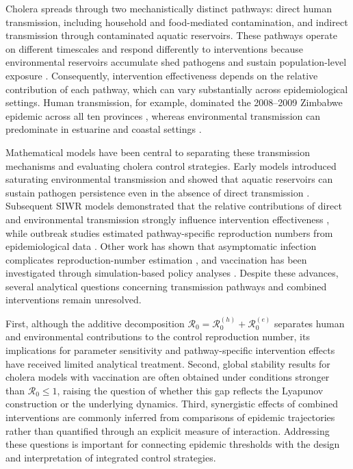 \documentclass[11pt]{article}
\theoremstyle{plain}
\theoremstyle{definition}
\theoremstyle{remark}
\newcommand{\Rz}{\mathcal{R}_0}
\newcommand{\Rzh}{\mathcal{R}_0^{(h)}}
\newcommand{\Rze}{\mathcal{R}_0^{(e)}}
\begin{document}
Cholera spreads through two mechanistically distinct pathways: direct human transmission, including household and food-mediated contamination, and indirect transmission through contaminated aquatic reservoirs. These pathways operate on different timescales and respond differently to interventions because environmental reservoirs accumulate shed pathogens and sustain population-level exposure \cite{codeco2001endemic,eisenberg2013environmental}. Consequently, intervention effectiveness depends on the relative contribution of each pathway, which can vary substantially across epidemiological settings. Human transmission, for example, dominated the 2008--2009 Zimbabwe epidemic across all ten provinces \cite{mukandavire2011estimating}, whereas environmental transmission can predominate in estuarine and coastal settings \cite{codeco2001endemic}.

Mathematical models have been central to separating these transmission mechanisms and evaluating cholera control strategies. Early models introduced saturating environmental transmission and showed that aquatic reservoirs can sustain pathogen persistence even in the absence of direct transmission \cite{capasso1979mathematical,codeco2001endemic}. Subsequent SIWR models demonstrated that the relative contributions of direct and environmental transmission strongly influence intervention effectiveness \cite{tien2010multiple}, while outbreak studies estimated pathway-specific reproduction numbers from epidemiological data \cite{mukandavire2011estimating}. Other work has shown that asymptomatic infection complicates reproduction-number estimation \cite{king2008inapparent}, and vaccination has been investigated through simulation-based policy analyses \cite{azman2015impact}. Despite these advances, several analytical questions concerning transmission pathways and combined interventions remain unresolved.

First, although the additive decomposition $\Rz=\Rzh+\Rze$ separates human and environmental contributions to the control reproduction number, its implications for parameter sensitivity and pathway-specific intervention effects have received limited analytical treatment. Second, global stability results for cholera models with vaccination are often obtained under conditions stronger than $\Rz\le1$, raising the question of whether this gap reflects the Lyapunov construction or the underlying dynamics. Third, synergistic effects of combined interventions are commonly inferred from comparisons of epidemic trajectories rather than quantified through an explicit measure of interaction. Addressing these questions is important for connecting epidemic thresholds with the design and interpretation of integrated control strategies.
\end{document}
